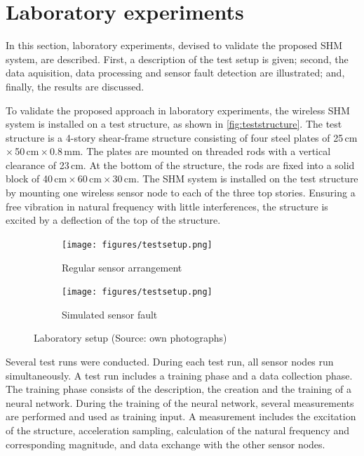 \documentclass[12pt,a4paper]{scrartcl}
\begin{document}
\section*{Laboratory experiments}
In this section, laboratory experiments, devised to validate the proposed SHM system, are described.
First, a description of the test setup is given; second, the data aquisition, data processing and sensor fault detection are illustrated; and, finally, the results are discussed. 

To validate the proposed approach in laboratory experiments, the wireless SHM system is installed on a test structure, as shown in \autoref{fig:teststructure}.
The test structure is a 4-story shear-frame structure consisting of four steel plates of 25\,cm\,$\times$\,50\,cm\,$\times$\,0.8\,mm.
The plates are mounted on threaded rods with a vertical clearance of 23\,cm.
At the bottom of the structure, the rods are fixed into a solid block of 40\,cm\,$\times$\,60\,cm\,$\times$\,30\,cm.
The SHM system is installed on the test structure by mounting one wireless sensor node to each of the three top stories.
Ensuring a free vibration in natural frequency with little interferences, the structure is excited by a deflection of the top of the structure.

\begin{figure}[htb]

	\centering
	
	\begin{subfigure}{0.49\textwidth}
		\texttt{[image: figures/testsetup.png]}
    	\caption{Regular sensor arrangement}
		\label{fig:teststructure}
    \end{subfigure}
  	\begin{subfigure}{0.49\textwidth}
		\texttt{[image: figures/testsetup.png]}
    	\caption{Simulated sensor fault}
        \label{fig:sensorfault}
	\end{subfigure}
  	\caption{Laboratory setup (Source: own photographs)}
\end{figure}

Several test runs were conducted.
During each test run, all sensor nodes run simultaneously.
A test run includes a training phase and a data collection phase.
The training phase consists of the description, the creation and the training of a neural network.
During the training of the neural network, several measurements are performed and used as training input.
A measurement includes the excitation of the structure, acceleration sampling, calculation of the natural frequency and corresponding magnitude, and data exchange with the other sensor nodes.
\end{document}
